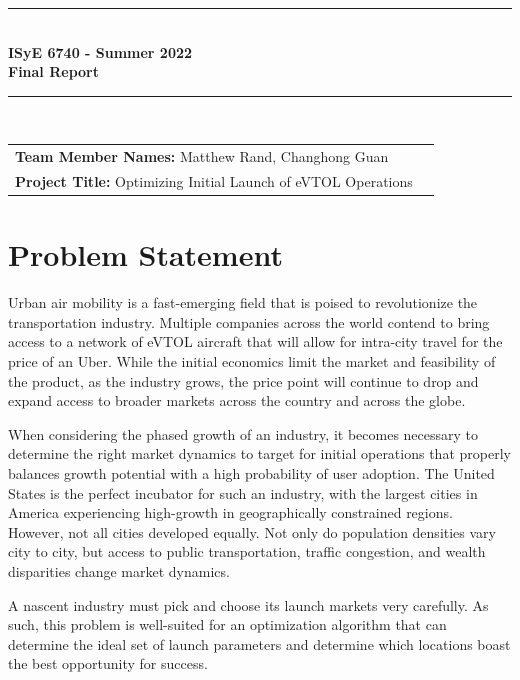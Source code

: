 \documentclass{article}
\begin{document}
\onehalfspacing
\begin{titlepage}
	
	\clearpage\thispagestyle{empty}
	\centering
	\vspace{1cm}
		
	\rule{\linewidth}{1mm} \\[0.5cm]
	{ \Large \bfseries ISyE 6740 - Summer 2022\\[0.2cm]
		Final Report}\\[0.5cm]
	\rule{\linewidth}{1mm} \\[1cm]
	
		\begin{tabular}{l p{5cm}}
		\textbf{Team Member Names:} Matthew Rand, Changhong Guan &   \\[10pt]
		\textbf{Project Title:} Optimizing Initial Launch of eVTOL Operations &  \\[10pt]
		\end{tabular} 
	
	\tableofcontents
	
\end{titlepage}

\section{Problem Statement}
		
Urban air mobility is a fast-emerging field that is poised to revolutionize the transportation industry. Multiple companies across the world contend to bring access to a network of eVTOL aircraft that will allow for intra-city travel for the price of an Uber. While the initial economics limit the market and feasibility of the product, as the industry grows, the price point will continue to drop and expand access to broader markets across the country and across the globe.

When considering the phased growth of an industry, it becomes necessary to determine the right market dynamics to target for initial operations that properly balances growth potential with a high probability of user adoption. The United States is the perfect incubator for such an industry, with the largest cities in America experiencing high-growth in geographically constrained regions. However, not all cities developed equally. Not only do population densities vary city to city, but access to public transportation, traffic congestion, and wealth disparities change market dynamics.

A nascent industry must pick and choose its launch markets very carefully. As such, this problem is well-suited for an optimization algorithm that can determine the ideal set of launch parameters and determine which locations boast the best opportunity for success.
\end{document}
